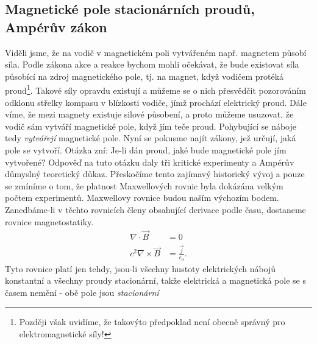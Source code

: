     \subsection{Magnetické pole stacionárních proudů, Ampérův zákon}
      Viděli jsme, že na vodič v magnetickém poli vytvářeném např. magnetem působí síla. Podle 
      zákona akce a reakce bychom mohli očekávat, že bude existovat síla působící na zdroj 
      magnetického pole, tj. na magnet, když vodičem protéká proud\footnote{Později však uvidíme, 
      že takovýto předpoklad není obecně správný pro elektromagnetické síly!}. Takové síly opravdu 
      existují a můžeme se o nich přesvědčit pozorováním odklonu střelky kompasu v blízkosti 
      vodiče, jímž prochází elektrický proud. Dále víme, že mezi magnety existuje silové působení, 
      a proto můžeme usuzovat, že vodič sám vytváří magnetické pole, když jím teče proud. 
      Pohybující se náboje tedy \emph{vytvářejí} magnetické pole. Nyní se pokusme najít zákony, 
      jež určují, jaká pole se vytvoří. Otázka zní: Je-li dán proud, jaké bude magnetické pole jím 
      vytvořené? Odpověď na tuto otázku daly tři kritické experimenty a Ampérův důmyslný 
      teoretický důkaz. Přeskočíme tento zajímavý historický vývoj a pouze se zmíníme o tom, že 
      platnost Maxwellových rovnic byla dokázána velkým počtem experimentů. Maxwellovy rovnice 
      budou naším výchozím bodem. Zanedbáme-li v těchto rovnicích členy obsahující derivace podle 
      času, dostaneme rovnice magnetostatiky.
      \begin{subequations}
        \begin{align}
          \nabla\cdot\vec{B}     &= 0                            \label{fyz:eq_mag011} \\
          c^2\nabla\times\vec{B} &= \frac{\vec{j}}{\epsilon_0}.  \label{fyz:eq_mag012}
        \end{align}
      \end{subequations}
      Tyto rovnice platí jen tehdy, jsou-li všechny hustoty elektrických nábojů konstantní a 
      všechny proudy stacionární, takže elektrická a magnetická pole se s časem nemění - obě pole 
      jsou \emph{stacionární}
      
